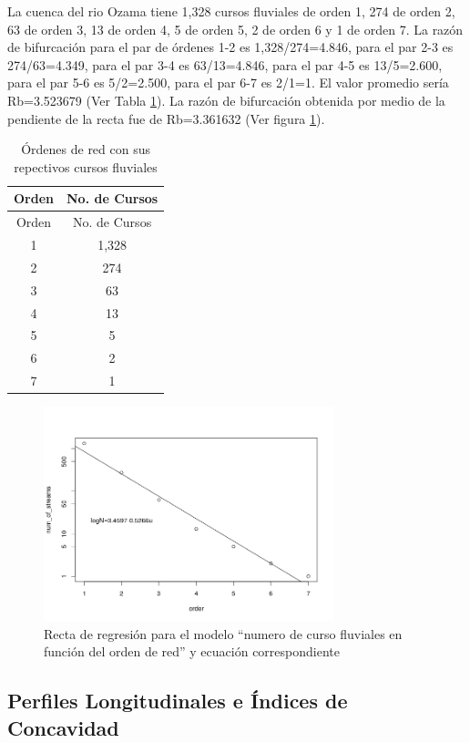 \documentclass[11pt,]{article}
\begin{document}
La cuenca del rio Ozama tiene 1,328 cursos fluviales de orden 1, 274 de
orden 2, 63 de orden 3, 13 de orden 4, 5 de orden 5, 2 de orden 6 y 1 de
orden 7. La razón de bifurcación para el par de órdenes 1-2 es
1,328/274=4.846, para el par 2-3 es 274/63=4.349, para el par 3-4 es
63/13=4.846, para el par 4-5 es 13/5=2.600, para el par 5-6 es
5/2=2.500, para el par 6-7 es 2/1=1. El valor promedio sería Rb=3.523679
(Ver Tabla \ref{tab:tabla}). La razón de bifurcación obtenida por medio
de la pendiente de la recta fue de Rb=3.361632 (Ver figura
\ref{fig:Rb_R}).

\begin{longtable}[]{@{}cc@{}}
\caption{Órdenes de red con sus repectivos cursos
fluviales\label{tab:tabla}}\tabularnewline
\toprule
Orden & No. de Cursos\tabularnewline
\midrule
\endfirsthead
\toprule
Orden & No. de Cursos\tabularnewline
\midrule
\endhead
1 & 1,328\tabularnewline
2 & 274\tabularnewline
3 & 63\tabularnewline
4 & 13\tabularnewline
5 & 5\tabularnewline
6 & 2\tabularnewline
7 & 1\tabularnewline
\bottomrule
\end{longtable}

\newpage

\begin{figure}
\centering
\includegraphics[width=0.75000\textwidth]{Productos Generados/recta_regresion.png}
\caption{\label{fig:Rb_R} Recta de regresión para el modelo ``numero de
curso fluviales en función del orden de red'' y ecuación
correspondiente}
\end{figure}

\subsection{Perfiles Longitudinales e Índices de
Concavidad}\label{perfiles-longitudinales-e-uxedndices-de-concavidad}
\end{document}
